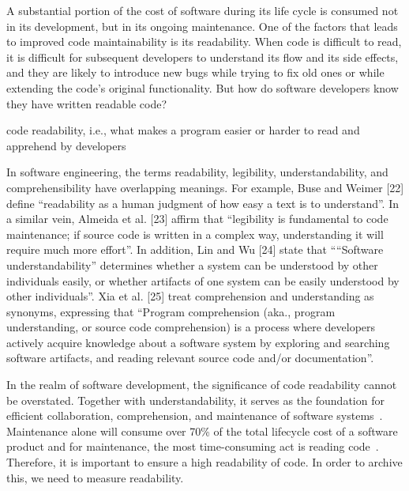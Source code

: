 \documentclass[%
class=scrreprt,
chapterprefix=false,%
open=right,%
twoside=false,%
paper=a4,%
logofile={Logo\_zentral\_farbig\_EN.png},%
thesistype=master,%
UKenglish,%
]{se2thesis}
\begin{document}
	 A substantial portion of the cost of software during its
	life cycle is consumed not in its development, but in its ongoing
	maintenance. One of the factors that leads to improved code
	maintainability is its readability. When code is difficult to read, it
	is difficult for subsequent developers to understand its flow and its
	side effects, and they are likely to introduce new bugs while trying
	to fix old ones or while extending the code’s original
	functionality. But how do software developers know they have
	written readable code? \cite{sedano2016code}
	
	code readability, i.e., what makes a program easier or harder to
	read and apprehend by developers \cite{oliveira2020evaluating}
	
	In software engineering, the terms readability, legibility, understandability, and comprehensibility have overlapping meanings. For example, Buse and Weimer [22] define “readability
	as a human judgment of how easy a text is to understand”.
	In a similar vein, Almeida et al. [23] affirm that “legibility is
	fundamental to code maintenance; if source code is written
	in a complex way, understanding it will require much more
	effort”. In addition, Lin and Wu [24] state that ““Software
	understandability” determines whether a system can be understood by other individuals easily, or whether artifacts of
	one system can be easily understood by other individuals”.
	Xia et al. [25] treat comprehension and understanding as
	synonyms, expressing that “Program comprehension (aka.,
	program understanding, or source code comprehension) is a
	process where developers actively acquire knowledge about a
	software system by exploring and searching software artifacts,
	and reading relevant source code and/or documentation”.\cite{oliveira2020evaluating}
	
	
	In the realm of software development, the significance of code readability cannot be overstated. Together with understandability, it serves as the foundation for efficient collaboration, comprehension, and maintenance of software systems~\cite{posnett2011simpler, aggarwal2002integrated}. 
	Maintenance alone will consume over 70\% of the total lifecycle cost of a software product and for maintenance, the most time-consuming act is reading code~\cite{buse2009learning, deimel1985uses, rugaber2000use, boehm2001defect}.
	Therefore, it is important to ensure a high readability of code. In order to archive this, we need to measure readability.
	
\end{document}
